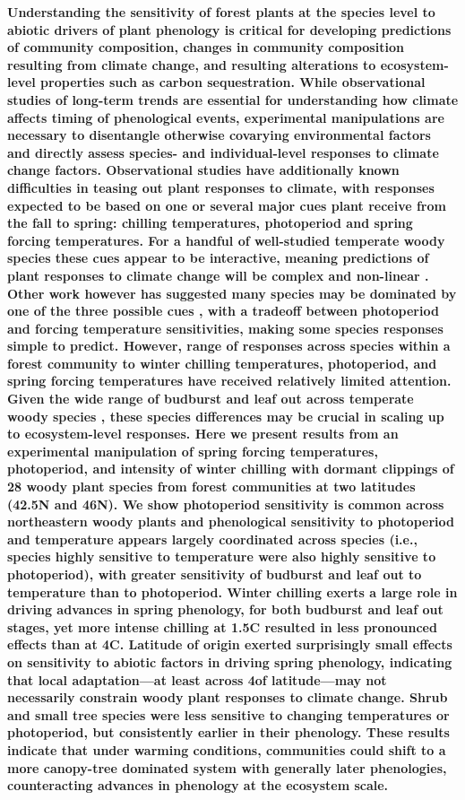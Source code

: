 \documentclass[12pt]{article}
\begin{document}
\textbf{Understanding the sensitivity of forest plants at the species level to abiotic drivers of plant phenology is critical for developing predictions of community composition, changes in community composition resulting from climate change, and resulting alterations to ecosystem-level properties such as carbon sequestration.  While observational studies of long-term trends are essential for understanding how climate affects timing of phenological events, experimental manipulations are necessary to disentangle otherwise covarying environmental factors and directly assess species- and individual-level responses to climate change factors. Observational studies have additionally known difficulties in teasing out plant responses to climate, with responses expected to be based on one or several major cues plant receive from the fall to spring: chilling temperatures, photoperiod and spring forcing temperatures. For a handful of well-studied temperate woody species these cues appear to be interactive, meaning predictions of plant responses to climate change will be complex and non-linear \cite{Chuine:1999aa}. Other work however has suggested many species may be dominated by one of the three possible cues \cite{Korner:2010}, with a tradeoff between photoperiod and forcing temperature sensitivities, making some species responses simple to predict. However, range of responses across species within a forest community to winter chilling temperatures, photoperiod, and spring forcing temperatures have received relatively limited attention. Given the wide range of budburst and leaf out across temperate woody species \cite{Polgar:2011aa}, these species differences may be crucial in scaling up to ecosystem-level responses. Here we present results from an experimental manipulation of spring forcing temperatures, photoperiod, and intensity of winter chilling with dormant clippings of 28 woody plant species from forest communities at two latitudes (42.5\degree N and 46\degree N). We show photoperiod sensitivity is common across northeastern woody plants and phenological sensitivity to photoperiod and temperature appears largely coordinated across species (i.e., species highly sensitive to temperature were also highly sensitive to photoperiod), with greater sensitivity of budburst and leaf out to temperature than to photoperiod. Winter chilling exerts a large role in driving advances in spring phenology, for both budburst and leaf out stages, yet more intense chilling at 1.5\degree C resulted in less pronounced effects than at 4\degree C. Latitude of origin exerted surprisingly small effects on sensitivity to abiotic factors in driving spring phenology, indicating that local adaptation---at least across 4\degree of latitude---may not necessarily constrain woody plant responses to climate change. Shrub and small tree species were less sensitive to changing temperatures or photoperiod, but consistently earlier in their phenology. These results indicate that under warming conditions, communities could shift to a more canopy-tree dominated system with generally later phenologies, counteracting advances in phenology at the ecosystem scale.}
\end{document}
